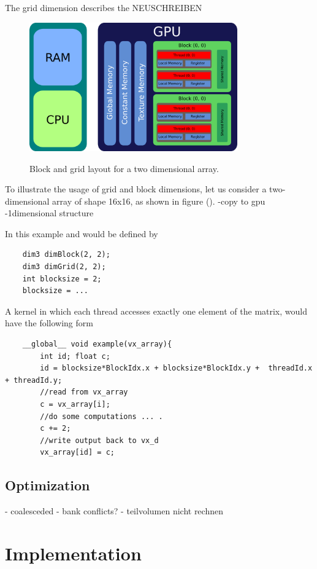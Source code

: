 The grid dimension describes the
NEUSCHREIBEN

\begin{figure}[!tbp]
  \centering
  \includegraphics[width=0.8\textwidth]{gfx/cuda/gpu.png}\label{fig:gpu_grid}
  \caption{Block and grid layout for a two dimensional array.}
\end{figure}

To illustrate the usage of grid and block dimensions, let us consider a two-dimensional array of shape 16x16, as shown in figure ().
-copy to gpu
-1dimensional structure

In this example  and  would be defined by
\begin{verbatim}
    dim3 dimBlock(2, 2);
    dim3 dimGrid(2, 2);
    int blocksize = 2;
    blocksize = ...
\end{verbatim}

A kernel in which each thread accesses exactly one element of the matrix, would have the following form

\begin{verbatim}
    __global__ void example(vx_array){
        int id; float c;
        id = blocksize*BlockIdx.x + blocksize*BlockIdx.y +  threadId.x + threadId.y;
        //read from vx_array
        c = vx_array[i];
        //do some computations ... .
        c += 2;
        //write output back to vx_d
        vx_array[id] = c;
\end{verbatim}

\subsection{Optimization}
- coalesceded
- bank conflicts?
- teilvolumen nicht rechnen
\newpage

\section{Implementation}

